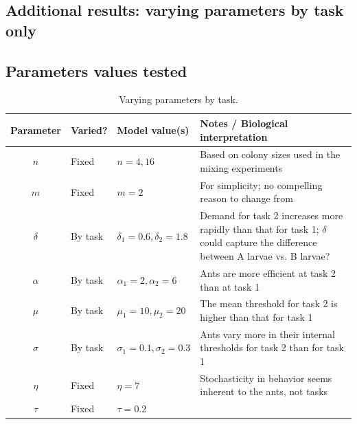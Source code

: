 \documentclass[11pt]{article}
\begin{document}
\begin{appendices}

\section{Additional results: varying parameters by task only}\label{sec:bytask}

\subsection{Parameters values tested}

\begin{table}[H] \small
  \begin{center}
    \begin{tabular}{|c|>{\centering}m{0.5in}|>{\centering}m{1.1in}|m{3.8in}|} 
      \hline
      \textbf{Parameter} & \textbf{Varied?} & \textbf{Model value(s)} & \textbf{Notes / Biological interpretation} \\ \hline
      $n$ & Fixed & $n = 4, 16$ & Based on colony sizes used in the mixing experiments \\ \hline
      $m$ & Fixed & $m = 2$ & For simplicity; no compelling reason to change from \cite{ulrich2018} \\ \hline
      $\delta$ & By task & $\delta_1 = 0.6, \delta_2 = 1.8 $ & Demand for task 2 increases more rapidly than that for task 1; $\delta$ could capture the difference between A larvae vs. B larvae? \\ \hline
      $\alpha$ & By task  & $\alpha_1 = 2,\alpha_2 = 6$ & Ants are more efficient at task 2 than at task 1 \\ \hline
      $\mu$ & By task  & $\mu_1 = 10,\mu_2 = 20 $ & The mean threshold for task 2 is higher than that for task 1\\ \hline
      $\sigma$ & By task & $\sigma_1 = 0.1, \sigma_2 = 0.3$ & Ants vary more in their internal thresholds for task 2 than for task 1 \\ \hline
      $\eta$ & Fixed & $\eta = 7$ & Stochasticity in behavior seems inherent to the ants, not tasks\\ \hline
      $\tau$ & Fixed & $\tau = 0.2$ & 
      \\ \hline
    \end{tabular}
    \caption{Varying parameters by task.}
    \label{tab:table3}
  \end{center}
\end{table}


\end{appendices}
\end{document}
